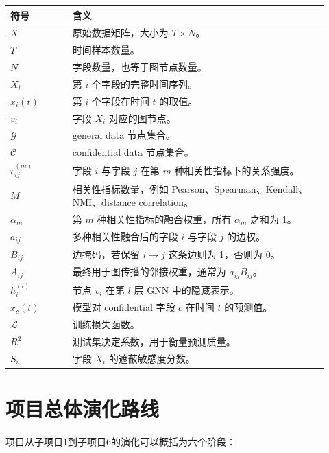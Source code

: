 \documentclass[UTF8]{ctexart}
\begin{document}
\begin{longtable}{p{0.18\linewidth}p{0.74\linewidth}}
\toprule
符号 & 含义 \\
\midrule
\endhead
\(X\) & 原始数据矩阵，大小为 \(T\times N\)。 \\
\(T\) & 时间样本数量。 \\
\(N\) & 字段数量，也等于图节点数量。 \\
\(X_i\) & 第 \(i\) 个字段的完整时间序列。 \\
\(x_i(t)\) & 第 \(i\) 个字段在时间 \(t\) 的取值。 \\
\(v_i\) & 字段 \(X_i\) 对应的图节点。 \\
\(\mathcal{G}\) & general data 节点集合。 \\
\(\mathcal{C}\) & confidential data 节点集合。 \\
\(r_{ij}^{(m)}\) & 字段 \(i\) 与字段 \(j\) 在第 \(m\) 种相关性指标下的关系强度。 \\
\(M\) & 相关性指标数量，例如 Pearson、Spearman、Kendall、NMI、distance correlation。 \\
\(\alpha_m\) & 第 \(m\) 种相关性指标的融合权重，所有 \(\alpha_m\) 之和为 1。 \\
\(a_{ij}\) & 多种相关性融合后的字段 \(i\) 与字段 \(j\) 的边权。 \\
\(B_{ij}\) & 边掩码，若保留 \(i\rightarrow j\) 这条边则为 1，否则为 0。 \\
\(A_{ij}\) & 最终用于图传播的邻接权重，通常为 \(a_{ij}B_{ij}\)。 \\
\(h_i^{(l)}\) & 节点 \(v_i\) 在第 \(l\) 层 GNN 中的隐藏表示。 \\
\(\hat{x}_c(t)\) & 模型对 confidential 字段 \(c\) 在时间 \(t\) 的预测值。 \\
\(\mathcal{L}\) & 训练损失函数。 \\
\(R^2\) & 测试集决定系数，用于衡量预测质量。 \\
\(S_i\) & 字段 \(X_i\) 的遮蔽敏感度分数。 \\
\bottomrule
\end{longtable}

\section{项目总体演化路线}

项目从子项目1到子项目6的演化可以概括为六个阶段：
\end{document}
